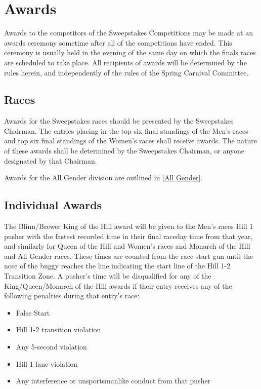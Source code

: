 \chapter{Awards}

	Awards to the competitors of the Sweepstakes Competitions may be made at an awards ceremony sometime after all of the competitions have ended. This ceremony is usually held in the evening of the same day on which the finals races are scheduled to take place. All recipients of awards will be determined by the rules herein, and independently of the rules of the Spring Carnival Committee.

\section{Races}

	Awards for the Sweepstakes races should be presented by the Sweepstakes Chairman. The entries placing in the top six final standings of the Men's races and top six final standings of the Women's races shall receive awards. The nature of these awards shall be determined by the Sweepstakes Chairman, or anyone designated by that Chairman.

	Awards for the All Gender division are outlined in \ref{All Gender}. 

\section{Individual Awards}

	The Blinn/Brewer King of the Hill award will be given to the Men's races Hill 1 pusher with the fastest recorded time in their final raceday time from that year, and similarly for Queen of the Hill and Women’s races and Monarch of the Hill and All Gender races. These times are counted from the race start gun until the nose of the buggy reaches the line indicating the start line of the Hill 1-2 Transition Zone. A pusher’s time will be disqualified for any of the King/Queen/Monarch of the Hill awards if their entry receives any of the following penalties during that entry’s race:

	\begin{itemize}

	\item False Start

	\item Hill 1-2 transition violation

	\item Any 5-second violation

	\item Hill 1 lane violation

	\item Any interference or unsportsmanlike conduct from that pusher

	\end{itemize}

